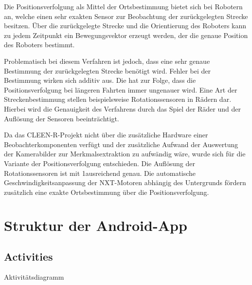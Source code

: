 Die Positionsverfolgung als Mittel der Ortsbestimmung bietet sich bei Robotern an, welche einen sehr exakten Sensor zur Beobachtung der zurückgelegten Strecke besitzen. Über die zurückgelegte Strecke und die Orientierung des Roboters kann zu jedem Zeitpunkt ein Bewegungsvektor erzeugt werden, der die genaue Position des Roboters bestimmt.

Problematisch bei diesem Verfahren ist jedoch, dass eine sehr genaue Bestimmung der zurückgelegten Strecke benötigt wird. Fehler bei der Bestimmung wirken sich additiv aus. Die hat zur Folge, dass die Positionsverfolgung bei längeren Fahrten immer ungenauer wird. Eine Art der Streckenbestimmung stellen beispielsweise Rotationssensoren in Rädern dar. Hierbei wird die Genauigkeit des Verfahrens durch das Spiel der Räder und der Auflösung der Sensoren beeinträchtigt.

Da das CLEEN-R-Projekt nicht über die zusätzliche Hardware einer Beobachterkomponenten verfügt und der zusätzliche Aufwand der Auswertung der Kamerabilder zur Merkmalsextraktion zu aufwändig wäre, wurde sich für die Variante der Positionsverfolgung entschieden. Die Auflösung der Rotationssensoren ist mit 1\degree ausreichend genau. Die automatische Geschwindigkeitsanpassung der NXT-Motoren abhängig des Untergrunds fördern zusätzlich eine exakte Ortsbestimmung über die Positionsverfolgung.

\section{Struktur der Android-App}
\subsection{Activities}
Aktivitätsdiagramm






